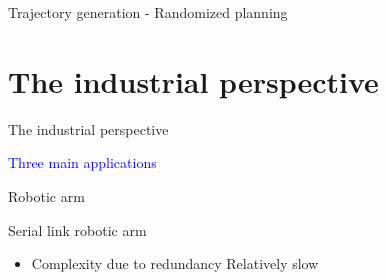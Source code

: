 \documentclass[usenames,dvipsnames,xcolor=table]{beamer}
\begin{document}
\begin{frame}{Trajectory generation - Randomized planning}
\end{frame}



\section{The industrial perspective}
\begin{frame}{The industrial perspective}
\begin{center}
    \Large{\textcolor{blue}{Three main applications}}
    \def\svgwidth{\linewidth}
    
\end{center}
\end{frame}

\begin{frame}{Robotic arm}
    \begin{center}
        \begin{minipage}{0.49\linewidth}
                \def\svgwidth{\linewidth}
                
        \end{minipage}
        \hfill
        \begin{minipage}{0.49\linewidth}
        \large{Serial link robotic arm}
        \begin{itemize}
            \pro Large work-space
            \pro Versatility
            \item[]
            \con Complexity due to redundancy
            \con Relatively slow
        \end{itemize}
        \end{minipage}
    \end{center}
\end{frame}
\end{document}
